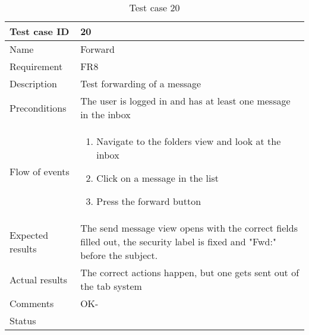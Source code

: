 		\begin{table}
			\begin{tabular}{l|p{10cm}}
				Test case ID & 20 \\ \hline
				Name & Forward\\ \hline
				Requirement &FR8\\ \hline
				Description & Test forwarding of a message\\ \hline
				Preconditions & The user is logged in and has at least one message in the inbox\\ \hline
				Flow of events & 
					\begin{enumerate}
						\item{}Navigate to the folders view and look at the inbox
						\item{}Click on a message in the list
						\item{}Press the forward button
					\end{enumerate} \\ \hline
				Expected results & The send message view opens with the correct fields filled out, the security label is fixed and "Fwd:" before the subject. \\ \hline
				Actual results & The correct actions happen, but one gets sent out of the tab system\\ \hline
				Comments & OK-\\ \hline
				Status & \\ \hline
			\end{tabular}
			\caption{Test case 20} \label{tab:case20}
		\end{table}

